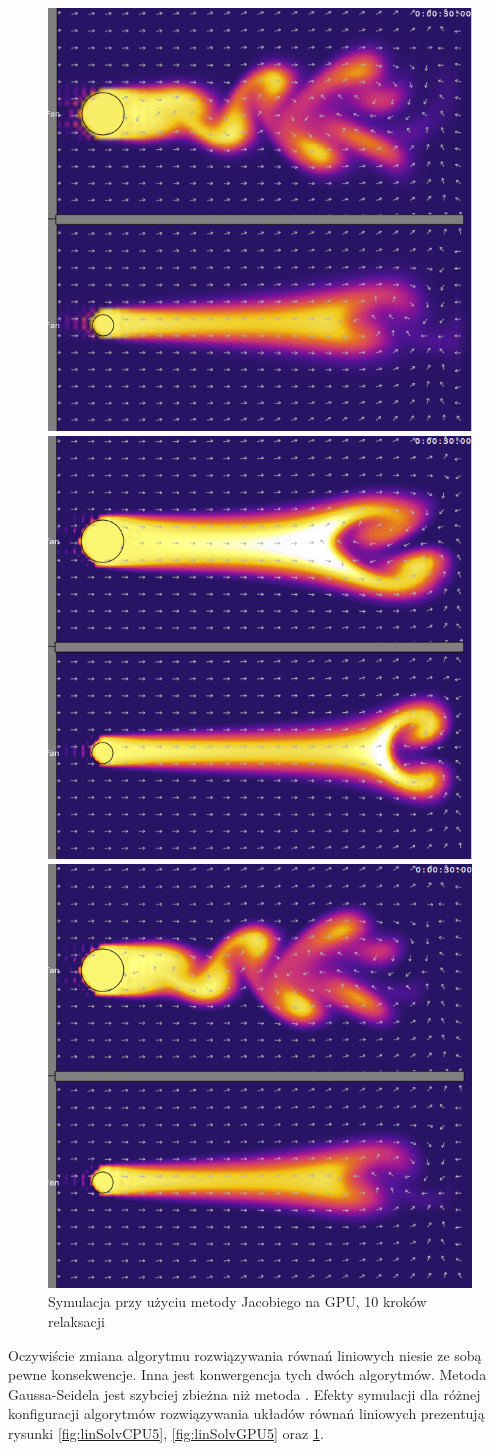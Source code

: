\begin{figure}[!p]
\centering

\includegraphics[width=.45\textwidth]{img/linSolvCPU5}
\caption{Symulacja przy użyciu metody Gaussa-Seidela na CPU, 
5 kroków relaksacji}
\label{fig:linSolvCPU5}

\includegraphics[width=.45\textwidth]{img/linSolvGPU5}
\caption{Symulacja przy użyciu metody Jacobiego na GPU, 
5 kroków relaksacji}
\label{fig:linSolvGPU5}

\includegraphics[width=.45\textwidth]{img/linSolvGPU10}
\caption{Symulacja przy użyciu metody Jacobiego na GPU, 
10 kroków relaksacji}
\label{fig:linSolvGPU10}

\end{figure}

Oczywiście zmiana algorytmu rozwiązywania równań liniowych niesie ze sobą
pewne konsekwencje. Inna jest konwergencja tych dwóch algorytmów. Metoda \ow
{Gaussa-Seidela} jest szybciej zbieżna niż metoda . Efekty
symulacji dla różnej konfiguracji algorytmów rozwiązywania układów równań
liniowych prezentują rysunki \ref{fig:linSolvCPU5}, \ref{fig:linSolvGPU5} oraz
\ref{fig:linSolvGPU10}.

